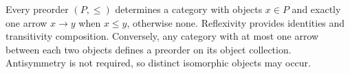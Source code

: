 
Every preorder $(P,\le)$ determines a category with objects $x\in P$ and exactly one arrow $x\to y$ when $x\le y$, otherwise none. Reflexivity provides identities and transitivity composition. Conversely, any category with at most one arrow between each two objects defines a preorder on its object collection. Antisymmetry is not required, so distinct isomorphic objects may occur.
